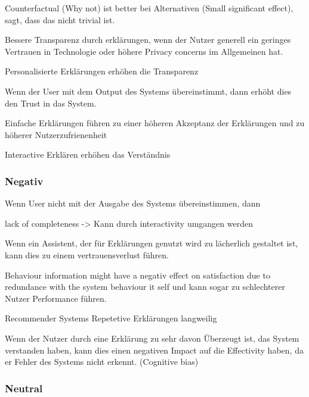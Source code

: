 Counterfactual (Why not) ist better bei Alternativen \cite{martin_evaluating_2021}  \cite{neerincx_using_2018} \cite{schrills_color_2020} (Small significant effect), \cite{lim_2009_assessing} sagt, dass das nicht trivial ist.

Bessere Transparenz durch erklärungen, wenn der Nutzer generell ein geringes Vertrauen in Technologie oder höhere Privacy concerns im Allgemeinen hat. \cite{tsai_effects_2020}

Personalisierte Erklärungen erhöhen die Transparenz \cite{sokol_one_2020, wiegand2019drive}

Wenn der User mit dem Output des Systems übereinstimmt, dann erhöht dies den Trust in das System. \cite{schrills_color_2020}

Einfache Erklärungen führen zu einer höheren Akzeptanz der Erklärungen und zu höherer Nutzerzufrienenheit \cite{hleg2019policy, sovrano_modelling_2020}

Interactive Erklären erhöhen das Verständnis \cite{cheng2019explaining}

\subsubsection*{Negativ}

Wenn User nicht mit der Ausgabe des Systems übereinstimmen, dann 

lack of completeness \cite{chazette_end-users_nodate} -> Kann durch interactivity umgangen werden

Wenn ein Assistent, der für Erklärungen genutzt wird zu lächerlich gestaltet ist, kann dies zu einem vertrauensverlust führen. \cite{wang_is_2018}

Behaviour information might have a negativ effect on satisfaction due to redundance with the system behaviour it self und kann sogar zu schlechterer Nutzer Performance führen. \cite{koo_why_2015}

Recommender Systems Repetetive Erklärungen \glqq langweilig\grqq{}

Wenn der Nutzer durch eine Erklärung zu sehr davon Überzeugt ist, das System verstanden haben, kann dies einen negativen Impact auf die Effectivity haben, da er Fehler des Systems nicht erkennt. (Cognitive bias) \cite{kohl_explainability_2019}

\subsubsection*{Neutral}

